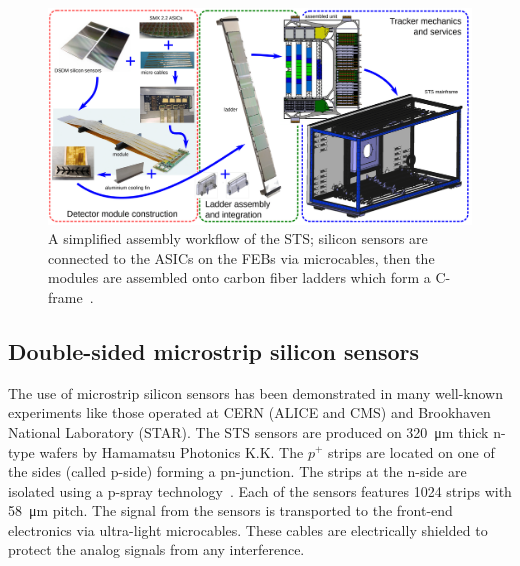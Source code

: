 \begin{figure}[!h]
\centering
\includegraphics[width=1\columnwidth]{Chapter2/images/assembly_sequence.png}
\caption{A simplified assembly workflow of the \gls{STS}; silicon sensors are connected to the ASICs on the \glspl{FEB} via microcables, then the modules are assembled onto carbon fiber ladders which form a C-frame~\cite{Teklishyn}.}
\label{fig_assembly}
\end{figure}






\subsection{Double-sided microstrip silicon sensors}
\label{sensors}

The use of microstrip silicon sensors has been demonstrated in many well-known experiments like those operated at \gls{CERN} (\gls{ALICE} and \gls{CMS}) and Brookhaven National Laboratory (\gls{STAR}). The \gls{STS} sensors are produced on \SI{320}{\micro\metre} thick n-type wafers by Hamamatsu Photonics K.K. The $p^{+}$ strips are located on one of the sides (called p-side) forming a pn-junction. The strips at the n-side are isolated using a p-spray technology~\cite{Heuser:54798}. Each of the sensors features 1024 strips with \SI{58}{\micro\metre} pitch. The signal from the sensors is transported to the front-end electronics via ultra-light microcables. These cables are electrically shielded to protect the analog signals from any interference. 

